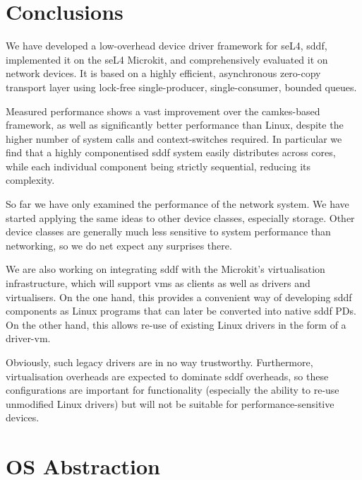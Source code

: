 \documentclass[a4paper,12pt]{report}
\begin{document}
\chapter{Conclusions}

We have developed a low-overhead device driver
framework for seL4, \gls{sddf}, implemented it on the seL4 Microkit, and
comprehensively evaluated it on network devices. It is based
on a highly efficient, asynchronous zero-copy transport layer using
lock-free single-producer, single-consumer, bounded queues.

Measured performance shows a vast improvement over the
\gls{camkes}-based framework, as well as significantly better performance than
Linux, despite the higher number of system calls and context-switches
required. In particular we find that a highly componentised \gls{sddf}
system easily distributes across cores, while each individual
component being strictly sequential, reducing its complexity.

So far we have only examined the performance of the network system. We
have started applying the same ideas to other device classes,
especially storage. Other device classes are generally much less
sensitive to system performance than networking, so we do net expect
any surprises there.

We are also working on integrating \gls{sddf} with the Microkit's
virtualisation infrastructure, which will support \glspl{vm} as clients as
well as drivers and virtualisers. On the one hand, this provides a
convenient way of developing \gls{sddf} components as Linux programs that
can later be converted into native \gls{sddf} PDs. On the other hand, this
allows re-use of existing Linux drivers in the form of a driver-\gls{vm}.

Obviously, such legacy drivers are in no way trustworthy. Furthermore,
virtualisation overheads are expected to dominate
\gls{sddf} overheads, so these configurations are important for
functionality (especially the ability to re-use unmodified Linux
drivers) but will not be suitable for performance-sensitive
devices.




\appendix

\chapter{OS Abstraction}\label{s:osal}
\end{document}

